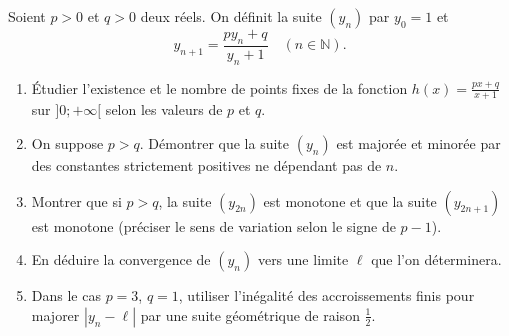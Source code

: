 \documentclass[11pt]{article}
\begin{document}
\begin{exercice}
Soient $p>0$ et $q>0$ deux réels. On définit la suite $(y_n)$ par $y_0=1$ et 
$$y_{n+1}=\frac{p y_n + q}{y_n + 1} \quad (n\in\mathbb{N}).$$
\begin{enumerate}
    \item Étudier l'existence et le nombre de points fixes de la fonction $h(x)=\frac{px+q}{x+1}$ sur $]0;+\infty[$ selon les valeurs de $p$ et $q$.
    \item On suppose $p>q$. Démontrer que la suite $(y_n)$ est majorée et minorée par des constantes strictement positives ne dépendant pas de $n$.
    \item Montrer que si $p>q$, la suite $(y_{2n})$ est monotone et que la suite $(y_{2n+1})$ est monotone (préciser le sens de variation selon le signe de $p-1$).
    \item En déduire la convergence de $(y_n)$ vers une limite $\ell$ que l'on déterminera.
    \item Dans le cas $p=3$, $q=1$, utiliser l'inégalité des accroissements finis pour majorer $|y_n-\ell|$ par une suite géométrique de raison $\frac{1}{2}$.
\end{enumerate}
\end{exercice}
\end{document}
